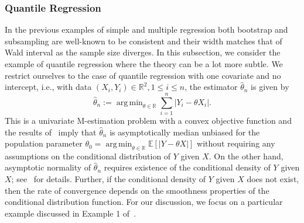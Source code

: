 \documentclass{article}
\numberwithin{myalgctr}{section}
\DeclareMathOperator*{\argmin}{arg\,min}
\begin{document}
\subsubsection{Quantile Regression}
{\color{black}
In the previous examples of simple and multiple regression both bootstrap and subsampling are well-known to be consistent and their width matches that of Wald interval as the sample size diverges. In this subsection, we consider the example of quantile regression where the theory can be a lot more subtle. We restrict ourselves to the case of quantile regression with one covariate and no intercept, i.e., with data $(X_i, Y_i)\in\mathbb{R}^2, 1\le i\le n$, the estimator $\widehat{\theta}_n$ is given by
\[
\widehat{\theta}_n := \argmin_{\theta\in\mathbb{R}}\sum_{i=1}^n |Y_i - \theta X_i|.
\] 
This is a univariate M-estimation problem with a convex objective function and the results of~\cite{kuchibhotla2021median} imply that $\widehat{\theta}_n$ is asymptotically median unbiased for the population parameter $\theta_0 = \argmin_{\theta\in\mathbb{R}}\mathbb{E}[|Y - \theta X|]$ without requiring any assumptions on the conditional distribution of $Y$ given $X$. On the other hand, asymptotic normality of $\widehat{\theta}_n$ requires existence of the conditional density of $Y$ given $X$; see~\cite{knight1998limiting,knight1999asymptotics,knight2008asymptotics} for details. Further, if the conditional density of $Y$ given $X$ does not exist, then the rate of convergence depends on the smoothness properties of the conditional distribution function. For our discussion, we focus on a particular example discussed in Example 1 of~\cite{knight1999asymptotics}. 

}
\end{document}
